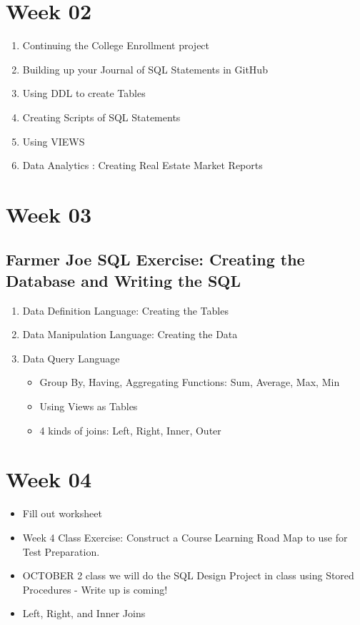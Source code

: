 \section {Week 02}
    
\begin{enumerate}
    \item Continuing the College Enrollment project
    \item Building up your Journal of SQL Statements in GitHub
     \item Using DDL to create Tables   
     \item Creating Scripts of SQL Statements   
     \item Using VIEWS
      \item Data Analytics : Creating Real Estate Market Reports
\end{enumerate}

\section {Week 03}
\subsection * {Farmer Joe SQL Exercise: Creating the Database and Writing the SQL}
\begin{enumerate}
    \item Data Definition Language: Creating the Tables
    \item Data Manipulation Language: Creating the Data
    \item Data Query Language
    \begin{itemize}
        \item Group By, Having, Aggregating Functions: Sum, Average, Max, Min 
        \item Using Views as Tables
        \item 4 kinds of joins: Left, Right, Inner, Outer
    \end{itemize} 
\end{enumerate}
    
\section * {Week 04}
\begin{itemize}
    \item Fill out worksheet
    \item Week 4 Class Exercise: Construct a Course Learning Road Map to use for Test Preparation.
    \item OCTOBER 2 class we will do the SQL Design Project in class using Stored Procedures - Write up is coming!
    \item Left, Right, and Inner Joins
\end{itemize}    
    
